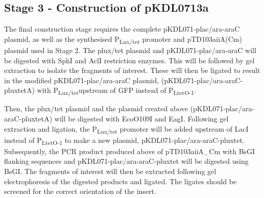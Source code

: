 \subsection{Stage 3 - Construction of pKDL0713a}

The final construction stage requires the complete pKDL071-plac/ara-araC plasmid, as well as the synthesised P\textsubscript{Lux/tet} promoter and pTD103aiiA(Cm) plasmid used in Stage 2. The plux/tet plasmid and pKDL071-plac/ara-araC will be digested with SphI and AclI restriction enzymes. This will be followed by gel extraction to isolate the fragments of interest. These will then be ligated to result in the modified pKDL071-plac/ara-araC plasmid, (pKDL071-plac/ara-araC-pluxtetA) with P\textsubscript{Lux/tet}upstream of GFP instead of P\textsubscript{LtetO-1}.
 
Then, the plux/tet plasmid and the plasmid created above (pKDL071-plac/ara-araC-pluxtetA) will be digested with EcoO109I and EagI. Following gel extraction and ligation, the P\textsubscript{Lux/tet} promoter will be added upstream of LacI instead of P\textsubscript{LtetO-1} to make a new plasmid, pKDL071-plac/ara-araC-pluxtet. Subsequently, the PCR product produced above of pTD103aiiA\_Cm with BsGI flanking sequences and pKDL071-plac/ara-araC-pluxtet will be digested using BsGI. The fragments of interest will then be extracted following gel electrophoresis of the digested products and ligated. The ligates should be screened for the correct orientation of the insert. 


